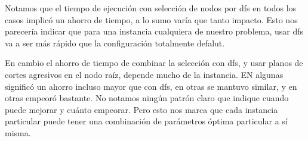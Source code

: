 \documentclass{article}
\begin{document}
        \begin{table}[H]
    \centering
    \caption{Comparación de tiempos para varias instancias}
    \end{table}

    Notamos que el tiempo de ejecución con selección de nodos por dfs en todos los casos implicó un ahorro de tiempo, a lo sumo varía que tanto impacto. Esto nos parecería indicar que para una instancia cualquiera de nuestro problema, usar dfs va a ser más rápido que la configuración totalmente defalut. 
    
    En cambio el ahorro de tiempo de combinar la selección con dfs, y usar planos de cortes agresivos en el nodo raíz, depende mucho de la instancia. EN algunas significó un ahorro incluso mayor que con dfs, en otras se mantuvo similar, y en otras empeoró bastante. No notamos ningún patrón claro que indique cuando puede mejorar y cuánto empeorar. Pero esto nos marca que cada instancia particular puede tener una combinación de parámetros óptima particular a sí misma.
\end{document}
